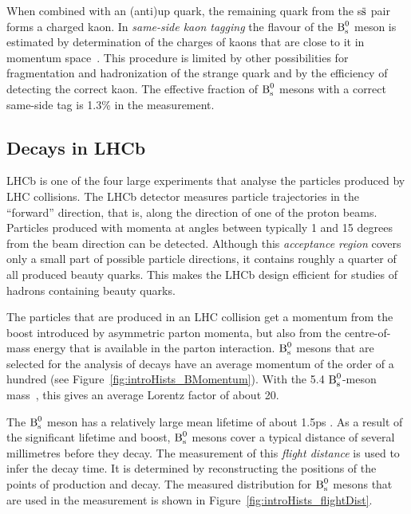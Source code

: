 When combined with an (anti)up quark, the remaining quark from the s$\qbar[s]$ pair forms a charged kaon. In \emph{same-side kaon tagging}
the flavour of the $\text{B}_\text{s}^\text{0}$ meson is estimated by determination of the charges of kaons that are close to it in momentum
space~\cite{LHCb-CONF-2012-033}. This procedure is limited by other possibilities for fragmentation and hadronization of the strange quark
and by the efficiency of detecting the correct kaon. The effective fraction of $\text{B}_\text{s}^\text{0}$ mesons with a correct same-side tag is 1.3\% in the
\BstoJpsiKK{} measurement.


\subsection{\texorpdfstring{\BstoJpsiKK}{Bs0->J/psi K+K-} Decays in LHCb}
\label{subsec:intro_LHCb_Jpsiphi}

LHCb is one of the four large experiments that analyse the particles produced by LHC collisions. The LHCb detector measures particle
trajectories in the ``forward'' direction, that is, along the direction of one of the proton beams. Particles produced with momenta at
angles between typically 1 and 15 degrees from the beam direction can be detected. Although this \emph{acceptance region} covers only a
small part of possible particle directions, it contains roughly a quarter of all produced beauty quarks. This makes the LHCb design
efficient for studies of hadrons containing beauty quarks.

The particles that are produced in an LHC collision get a momentum from the boost introduced by asymmetric parton momenta, but also from
the centre-of-mass energy that is available in the parton interaction. $\text{B}_\text{s}^\text{0}$ mesons that are selected for the analysis of \BstoJpsiKK{}
decays have an average momentum of the order of a hundred \GeVc{} (see Figure~\ref{fig:introHists_BMomentum}). With the 5.4\unitsp\GeV{}
$\text{B}_\text{s}^\text{0}$-meson mass~\cite{PDG}, this gives an average Lorentz factor of about 20.

The $\text{B}_\text{s}^\text{0}$ meson has a relatively large mean lifetime of about 1.5\unitsp{}ps \cite{Amhis:2012bh}. As a result of the significant lifetime
and boost, $\text{B}_\text{s}^\text{0}$ mesons cover a typical distance of several millimetres before they decay. The measurement of this \emph{flight distance}
is used to infer the decay time. It is determined by reconstructing the positions of the points of production and decay. The measured
distribution for $\text{B}_\text{s}^\text{0}$ mesons that are used in the \BstoJpsiKK{} measurement is shown in Figure~\ref{fig:introHists_flightDist}.

